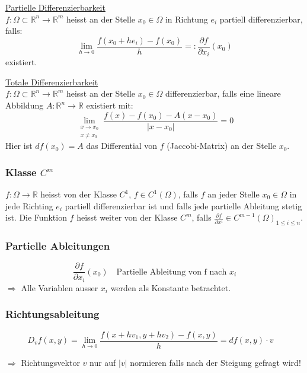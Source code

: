 \documentclass[6pt]{article}
\begin{document}
\begin{multicols*}{3}
	\underline{Partielle Differenzierbarkeit} \\
	$f: \Omega \subset \mathbb{R}^n \to \mathbb{R}^m$ heisst an der Stelle $x_0 \in \Omega$ in Richtung $e_i$ partiell differenzierbar, falls:
	\[
			\lim_{h \to 0} \frac{f(x_0 + he_i)-f(x_0)}{h} =: \frac{\partial f}{\partial x_i} (x_0)
	\]
	existiert.
	\vspace{4mm}
		
	
	\underline{Totale Differenzierbarkeit} \\
	 $f: \Omega \subset \mathbb{R}^n \to \mathbb{R}^m$ heisst an der Stelle $x_0 \in \Omega$ differenzierbar, falls eine lineare Abbildung $A: \mathbb{R}^n \to \mathbb{R}$ existiert mit:
	\[ 
		\lim_{\substack{x \to x_0\\ x \neq x_0}} \frac{f(x)-f(x_0)-A(x-x_0)}{|x-x_0|} =0
	 \]
	Hier ist $df(x_0) = A$  das Differential von $f$ (Jaccobi-Matrix) an der Stelle $x_0$.
	
	\subsubsection*{Klasse $C^m$}
		$f:\Omega \to \mathbb{R}$ heisst von der Klasse $C^1$, $f \in C^1(\Omega)$, falls $f$ an jeder Stelle $x_0 \in \Omega$ in jede Richting $e_i$ partiell
	differenzierbar ist und falls jede partielle Ableitung stetig ist.
	Die Funktion $f$ heisst weiter von der Klasse $C^m$, falls $ \frac{\partial f}{\partial x^i} \in C^{m-1}(\Omega)_{1 \leq i \leq n} $.

	
	\subsubsection*{Partielle Ableitungen}
	
	\[
	   \frac{\partial f}{\partial x_i} (x_0) \quad \text{Partielle Ableitung von f nach $x_i$}
	 \]
	 $\Rightarrow $ Alle Variablen ausser $x_i$ werden als Konstante betrachtet.
	
	\subsubsection*{Richtungsableitung}
	\[
			D_vf(x,y) = \lim_{h \to 0} \frac{f(x+hv_1 , y+hv_2)-f(x,y)}{h} = df(x,y) \cdot v \quad 
	\]
	
	$\Rightarrow$ Richtungsvektor $v$ nur auf $|v|$ normieren falls nach der Steigung gefragt wird! \vspace{2mm}\\
	

\end{multicols*}
\end{document}
